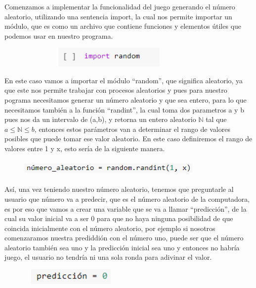 \documentclass[a4paper,12pt]{article}
\begin{document}
\large{Comenzamos a implementar la funcionalidad del juego generando el número aleatorio, utilizando una sentencia import, la cual nos permite importar un módulo, que es como un archivo que contiene funciones y elementos útiles que podemos usar en nuestro programa. }

\begin{figure}[H]
    \caption{}
    \centering \includegraphics[width=9cm, height=1cm]{a_7.png}
    \label{fig1:my_label}
\end{figure}

\large{En este caso vamos a importar el módulo ``random'', que significa aleatorio, ya que este nos permite trabajar con procesos aleatorios y pues para nuestro pograma necesitamos generar un número aleatorio y que sea entero, para lo que necesitamos también a la función ``randint'', la cual toma dos parametros a y b pues nos da un intervalo de (a,b), y retorna un entero aleatorio $\mathbb{N}$ tal que $a\leq \mathbb{N} \leq b$, entonces estos parámetros van a determinar
el rango de valores posibles que puede tomar ese valor aleatorio. En este caso definiremos el rango de valores entre 1 y x, esto sería de la siguiente manera.}

\begin{figure}[H]
    \caption{}
    \centering \includegraphics[width=9cm, height=0.8cm]{a_8.png}
    \label{fig1:my_label}
\end{figure}

\large{Así, una vez teniendo nuestro número aleatorio, tenemos que preguntarle al usuario que número va a predecir, que es el número aleatorio de la computadora, es por eso que vamos a crear una variable que se va a llamar ``predicción'', de la cual su valor inicial va a ser 0 para que no haya ninguna posibilidad de que coincida inicialmente con el número aleatorio, por ejemplo si nosotros comenzaramos nuestra prediddión con el número uno, puede ser que el número aleatorio también sea uno y la predicción inicial sea uno y entonces no habría juego, el usuario no tendría ni una sola ronda para adivinar el valor.}

\begin{figure}[H]
    \caption{}
    \centering \includegraphics[width=5cm, height=0.8cm]{a_9.png}
    \label{fig1:my_label}
\end{figure}
\end{document}
